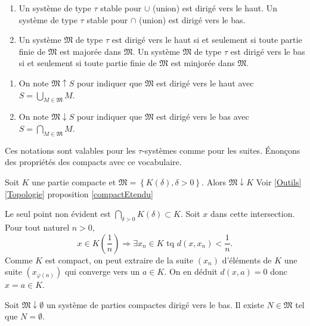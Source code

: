 \begin{rems}
 \begin{enumerate}
  \item Un système de type $\tau$ stable pour $\cup$ (union) est dirigé vers le haut. Un système de type $\tau$ stable pour $\cap$ (union) est dirigé vers le bas.
  \item Un système $\mathfrak{M}$ de type $\tau$ est dirigé vers le haut si et seulement si toute partie finie de $\mathfrak{M}$ est majorée dans $\mathfrak{M}$. Un système $\mathfrak{M}$ de type $\tau$ est dirigé vers le bas si et seulement si toute partie finie de $\mathfrak{M}$ est minjorée dans $\mathfrak{M}$.
 \end{enumerate}
\end{rems}
\begin{defi}
 \begin{enumerate}
  \item On note $\mathfrak{M}\uparrow S$ pour indiquer que $\mathfrak{M}$ est dirigé vers le haut avec $S = \bigcup_{M \in \mathfrak{M}}M$.
  \item On note $\mathfrak{M}\downarrow S$ pour indiquer que $\mathfrak{M}$ est dirigé vers le bas avec $S = \bigcap_{M \in \mathfrak{M}}M$.
 \end{enumerate}
\end{defi}
\noindent Ces notations sont valables pour les $\tau$-systèmes comme pour les suites. Énonçons des propriétés des compacts avec ce vocabulaire.
\begin{exple} \label{systAproxCompact}
 Soit $K$ une partie compacte et $\mathfrak{M} = \left\lbrace K(\delta), \delta >0  \right\rbrace$. Alors $\mathfrak{M} \downarrow K$ Voir \ref{Outils}  \ref{Topologie} proposition  \ref{compactEtendu}
\end{exple}
\begin{demo}
 Le seul point non évident est $\bigcap_{\delta > 0} K(\delta) \subset K$. Soit $x$ dans cette intersection. Pour tout naturel $n>0$,
 \begin{displaymath}
  x \in K(\frac{1}{n}) \Rightarrow \exists x_n \in K \text{ tq } d(x,x_n) < \frac{1}{n}.
 \end{displaymath}
Comme $K$ est compact, on peut extraire de la suite $(x_n)$ d'éléments de $K$ une suite $(x_{\varphi(n)})$ qui converge vers un $a\in K$. On en déduit $d(x,a)=0$ donc $x=a \in K$.
\end{demo}
\begin{propn}\label{FamDecCompacts}
 Soit $\mathfrak{M}\downarrow \emptyset$ un système de parties compactes dirigé vers le bas. Il existe $N \in \mathfrak{M}$ tel que $N = \emptyset$.
\end{propn}
